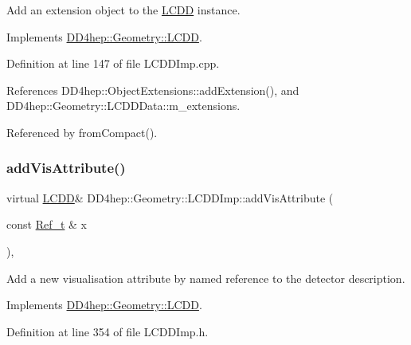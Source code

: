 Add an extension object to the \hyperlink{class_d_d4hep_1_1_geometry_1_1_l_c_d_d}{L\+C\+DD} instance. 



Implements \hyperlink{class_d_d4hep_1_1_geometry_1_1_l_c_d_d_ae4fdea118902519ae7581fe0bd733559}{D\+D4hep\+::\+Geometry\+::\+L\+C\+DD}.



Definition at line 147 of file L\+C\+D\+D\+Imp.\+cpp.



References D\+D4hep\+::\+Object\+Extensions\+::add\+Extension(), and D\+D4hep\+::\+Geometry\+::\+L\+C\+D\+D\+Data\+::m\+\_\+extensions.



Referenced by from\+Compact().

\hypertarget{class_d_d4hep_1_1_geometry_1_1_l_c_d_d_imp_a6b0b4c0f5d67a156215447e385820dc4}{}\label{class_d_d4hep_1_1_geometry_1_1_l_c_d_d_imp_a6b0b4c0f5d67a156215447e385820dc4} 
\subsubsection{\texorpdfstring{add\+Vis\+Attribute()}{addVisAttribute()}}
{\footnotesize\ttfamily virtual \hyperlink{class_d_d4hep_1_1_geometry_1_1_l_c_d_d}{L\+C\+DD}\& D\+D4hep\+::\+Geometry\+::\+L\+C\+D\+D\+Imp\+::add\+Vis\+Attribute (\begin{DoxyParamCaption}\item[{const \hyperlink{group___d_d4_h_e_p___g_e_o_m_e_t_r_y_ga40af83be6718bb8828a3d83dc7f8c930}{Ref\+\_\+t} \&}]{x }\end{DoxyParamCaption})\hspace{0.3cm}{\ttfamily [inline]}, {\ttfamily [virtual]}}



Add a new visualisation attribute by named reference to the detector description. 



Implements \hyperlink{class_d_d4hep_1_1_geometry_1_1_l_c_d_d_a705cc171273fe3aa63100385b1bd7191}{D\+D4hep\+::\+Geometry\+::\+L\+C\+DD}.



Definition at line 354 of file L\+C\+D\+D\+Imp.\+h.



